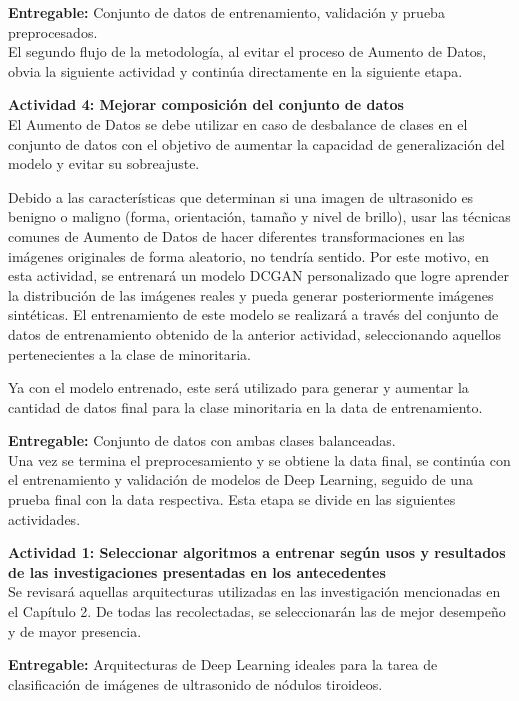 \textbf{Entregable:} Conjunto de datos de entrenamiento, validación y prueba preprocesados.
\\
El segundo flujo de la metodología, al evitar el proceso de Aumento de Datos, obvia la siguiente actividad y continúa directamente en la siguiente etapa.

\textbf{Actividad 4: Mejorar composición del conjunto de datos}
\\
El Aumento de Datos se debe utilizar en caso de desbalance de clases en el conjunto de datos con el objetivo de aumentar la capacidad de generalización del modelo y evitar su sobreajuste.

Debido a las características que determinan si una imagen de ultrasonido es benigno o maligno (forma, orientación, tamaño y nivel de brillo), usar las técnicas comunes de Aumento de Datos de hacer diferentes transformaciones en las imágenes originales de forma aleatorio, no tendría sentido. Por este motivo, en esta actividad, se entrenará un modelo DCGAN personalizado que logre aprender la distribución de las imágenes reales y pueda generar posteriormente imágenes sintéticas. El entrenamiento de este modelo se realizará a través del conjunto de datos de entrenamiento obtenido de la anterior actividad, seleccionando aquellos pertenecientes a la clase de minoritaria.

Ya con el modelo entrenado, este será utilizado para generar y aumentar la cantidad de datos final para la clase minoritaria en la data de entrenamiento.

\textbf{Entregable:} Conjunto de datos con ambas clases balanceadas.
\\
Una vez se termina el preprocesamiento y se obtiene la data final, se continúa con el entrenamiento y validación de modelos de Deep Learning, seguido de una prueba final con la data respectiva. Esta etapa se divide en las siguientes actividades.

\textbf{Actividad 1: Seleccionar algoritmos a entrenar según usos y resultados de las investigaciones presentadas en los antecedentes}
\\
Se revisará aquellas arquitecturas utilizadas en las investigación mencionadas en el Capítulo 2. De todas las recolectadas, se seleccionarán las de mejor desempeño y de mayor presencia.

\textbf{Entregable:} Arquitecturas de Deep Learning ideales para la tarea de clasificación de imágenes de ultrasonido de nódulos tiroideos.
\\

